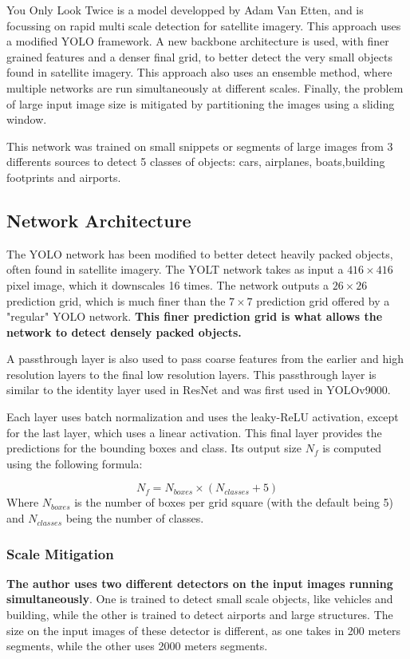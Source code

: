 
You Only Look Twice is a model developped by Adam Van Etten, and is focussing on rapid multi scale detection for satellite imagery. This approach uses a modified YOLO\cite{yolov3} framework. A new backbone architecture is used, with finer grained features and a denser final grid, to better detect the very small objects found in satellite imagery. This approach also uses an ensemble method, where multiple networks are run simultaneously at different scales. Finally, the problem of large input image size is mitigated by partitioning the images using a sliding window.

This network was trained on small snippets or segments of large images from 3 differents sources to detect 5 classes of objects: cars, airplanes, boats,building footprints and airports.
\subsection{Network Architecture}
The YOLO network has been modified to better detect heavily packed objects, often found in satellite imagery. The YOLT network takes as input a $416 \times 416$ pixel image, which it downscales 16 times. The network outputs a $26 \times 26$ prediction grid, which is much finer than the $7 \times 7$ prediction grid offered by a "regular" YOLO network. \textbf{This finer prediction grid is what allows the network to detect densely packed objects.}


A passthrough layer is also used to pass coarse features from the earlier and high resolution layers to the final low resolution layers. This passthrough layer is similar to the identity layer used in ResNet\cite{resNet} and was first used in YOLOv9000\cite{yolov9000}.
 
Each layer uses batch normalization\cite{batchNorm} and uses the leaky-ReLU activation\cite{leakyRelu}, except for the last layer, which uses a linear activation. This final layer provides the predictions for the bounding boxes and class. Its output size $N_f$ is computed using the following formula:

\begin{equation}
	N_f = N_{boxes} \times (N_{classes} + 5)
\end{equation}
Where $N_{boxes}$ is the number of boxes per grid square (with the default being 5) and $N_{classes}$ being the number of classes.
\subsubsection{Scale Mitigation}
\textbf{The author uses two different detectors on the input images running simultaneously}. One is trained to detect small scale objects, like vehicles and building, while the other is trained to detect airports and large structures. The size on the input images of these detector is different, as one takes in 200 meters segments, while the other uses 2000 meters segments. 

